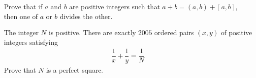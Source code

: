 %

\begin{problem}
	Prove that if $a$ and $b$ are positive integers such that $a+b=(a,b)+[a,b]$, then one of $a$ or $b$ divides the other.
\end{problem}

%
%
%

\begin{problem} %
	The integer $N$ is positive. There are exactly $2005$ ordered pairs $(x, y)$ of positive integers satisfying
		\begin{align*}
			\dfrac{1}{x} + \dfrac{1}{y} = \dfrac{1}{N}
		\end{align*}
	Prove that $N$ is a perfect square.
\end{problem}


